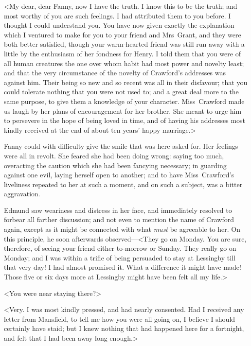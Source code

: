 <My dear, dear Fanny, now I have the truth. I know this to be the truth; and most worthy of you are such feelings. I had attributed them to you before. I thought I could understand you. You have now given exactly the explanation which I ventured to make for you to your friend and Mrs~Grant, and they were both better satisfied, though your warm-hearted friend was still run away with a little by the enthusiasm of her fondness for Henry. I told them that you were of all human creatures the one over whom habit had most power and novelty least; and that the very circumstance of the novelty of Crawford's addresses was against him. Their being so new and so recent was all in their disfavour; that you could tolerate nothing that you were not used to; and a great deal more to the same purpose, to give them a knowledge of your character. Miss~Crawford made us laugh by her plans of encouragement for her brother. She meant to urge him to persevere in the hope of being loved in time, and of having his addresses most kindly received at the end of about ten years' happy marriage.>

Fanny could with difficulty give the smile that was here asked for. Her feelings were all in revolt. She feared she had been doing wrong: saying too much, overacting the caution which she had been fancying necessary; in guarding against one evil, laying herself open to another; and to have Miss~Crawford's liveliness repeated to her at such a moment, and on such a subject, was a bitter aggravation.

Edmund saw weariness and distress in her face, and immediately resolved to forbear all farther discussion; and not even to mention the name of Crawford again, except as it might be connected with what \textit{must}  be agreeable to her. On this principle, he soon afterwards observed—<They go on Monday. You are sure, therefore, of seeing your friend either to-morrow or Sunday. They really go on Monday; and I was within a trifle of being persuaded to stay at Lessingby till that very day! I had almost promised it. What a difference it might have made! Those five or six days more at Lessingby might have been felt all my life.>

<You were near staying there?>

<Very. I was most kindly pressed, and had nearly consented. Had I received any letter from Mansfield, to tell me how you were all going on, I believe I should certainly have staid; but I knew nothing that had happened here for a fortnight, and felt that I had been away long enough.>

